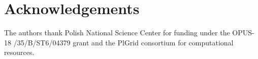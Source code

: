 
\section*{Acknowledgements}
The authors thank Polish National Science Center for funding
under the OPUS-18 /35/B/ST6/04379 grant and the PlGrid
consortium for computational resources.
